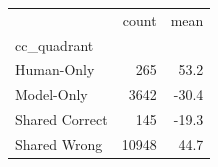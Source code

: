 \begin{tabular}{lrr}
\toprule
 & count & mean \\
cc_quadrant &  &  \\
\midrule
Human-Only & 265 & 53.2 \\
Model-Only & 3642 & -30.4 \\
Shared Correct & 145 & -19.3 \\
Shared Wrong & 10948 & 44.7 \\
\bottomrule
\end{tabular}
